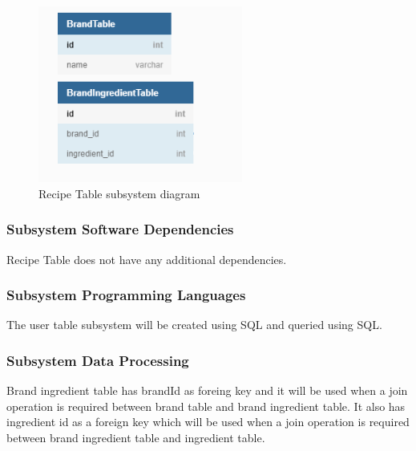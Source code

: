 \begin{figure}[h!]
	\centering
 	\includegraphics[width=0.60\textwidth]{images/Brand_Table.png}
 \caption{Recipe Table subsystem diagram}
\end{figure}

\subsubsection{Subsystem Software Dependencies}
Recipe Table does not have any additional dependencies.

\subsubsection{Subsystem Programming Languages}
The user table subsystem will be created using SQL and queried using SQL.

\subsubsection{Subsystem Data Processing}
Brand ingredient table has brandId as foreing key and it will be used when a join operation is required between brand table and brand ingredient table. It also has ingredient id as a foreign key which will be used when a join operation is required between brand ingredient table and ingredient table.
